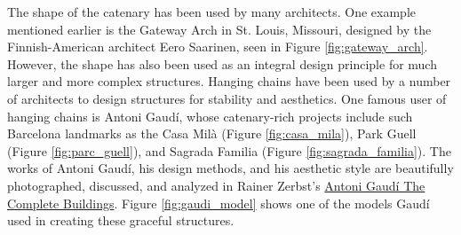 \documentclass{thesis}
\begin{document}
The shape of the catenary has been used by many architects.  One example mentioned earlier is the Gateway Arch in St. Louis, Missouri, designed by
the Finnish-American architect Eero Saarinen, seen in Figure \ref{fig:gateway_arch}.  However, the shape has also been used as an integral design
principle for much larger and more complex structures.  Hanging chains have been used by a number of architects to design structures for stability and
aesthetics.  One famous user of hanging chains is Antoni Gaud\'{i}, whose catenary-rich projects include such Barcelona landmarks as the Casa Mil\`{a}
(Figure \ref{fig:casa_mila}), Park Guell (Figure \ref{fig:parc_guell}), and Sagrada Familia (Figure \ref{fig:sagrada_familia}).  The works of Antoni
Gaud\'{i}, his design methods, and his aesthetic style are beautifully photographed, discussed, and analyzed in Rainer Zerbst's
\underline{Antoni Gaud\'{i} The Complete Buildings}\cite{zerbst85gaudi}.  Figure \ref{fig:gaudi_model} shows one of the models Gaud\'{i} used in
creating these graceful structures.
\end{document}
